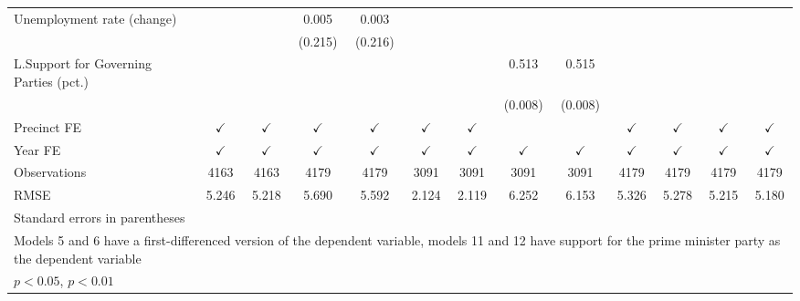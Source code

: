 \begin{sidewaystable}[htbp]
\begin{tabular}{l*{12}{c}}
Unemployment rate (change)&                    &                    &       0.005        &       0.003        &                    &                    &                    &                    &                    &                    &                    &                    \\
                    &                    &                    &     (0.215)        &     (0.216)        &                    &                    &                    &                    &                    &                    &                    &                    \\
L.Support for Governing Parties (pct.)&                    &                    &                    &                    &                    &                    &       0.513\sym{**}&       0.515\sym{**}&                    &                    &                    &                    \\
                    &                    &                    &                    &                    &                    &                    &     (0.008)        &     (0.008)        &                    &                    &                    &                    \\
\hline Precinct FE  &$\checkmark$        &$\checkmark$        &$\checkmark$        &$\checkmark$        &$\checkmark$        &$\checkmark$        &                    &                    &$\checkmark$        &$\checkmark$        &$\checkmark$        &$\checkmark$        \\
Year FE             &$\checkmark$        &$\checkmark$        &$\checkmark$        &$\checkmark$        &$\checkmark$        &$\checkmark$        &$\checkmark$        &$\checkmark$        &$\checkmark$        &$\checkmark$        &$\checkmark$        &$\checkmark$        \\
\hline
Observations        &        4163        &        4163        &        4179        &        4179        &        3091        &        3091        &        3091        &        3091        &        4179        &        4179        &        4179        &        4179        \\
RMSE                &       5.246        &       5.218        &       5.690        &       5.592        &       2.124        &       2.119        &       6.252        &       6.153        &       5.326        &       5.278        &       5.215        &       5.180        \\
\hline\hline
\multicolumn{13}{l}{\footnotesize Standard errors in parentheses}\\
\multicolumn{13}{l}{\footnotesize Models 5 and 6 have a first-differenced version of the dependent variable, models 11 and 12 have support for the prime minister party as the dependent variable}\\
\multicolumn{13}{l}{\footnotesize \sym{*} \(p<0.05\), \sym{**} \(p<0.01\)}\\
\end{tabular}
\end{sidewaystable}
